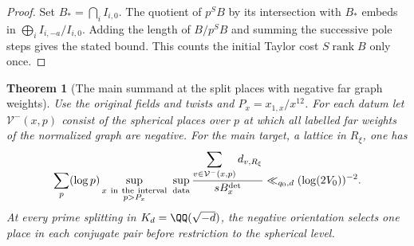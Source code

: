 \documentclass[a4paper,11pt]{article}
\newtheorem{theorem}[proposition]{Theorem}
\theoremstyle{definition}
\theoremstyle{remark}
\numberwithin{equation}{section}
\begin{document}
\begin{proof}
Set \(B_*=\bigcap_i I_{i,0}\). The quotient of \(p^SB\)
by its intersection with \(B_*\) embeds in
\(\bigoplus_i I_{i,-a}/I_{i,0}\).
Adding the length of \(B/p^SB\) and summing the successive
pole steps gives the stated bound. This counts the initial
Taylor cost \(S\operatorname{rank}B\) only once.
\end{proof}

\begin{theorem}[The main summand at the split places with negative far graph weights]
\leavevmode\label{thm:neggraph794}
Use the original fields and twists and \(P_x=x_{1,x}/x^{12}\).
For each datum let \(\mathcal V^-(x,p)\) consist of the spherical
places over \(p\) at which all labelled far weights of the
normalized graph are negative. For the main target, a lattice
in \(R_\xi\), one has
\[
 \sum_p(\log p)\sup_{\substack{x\ {\rm in\ the\ interval}\\p>P_x}}
 \ \sup_{\rm data}
 \frac{\displaystyle\sum_{v\in\mathcal V^-(x,p)}d_{v,R_\xi}}
      {s B_x^{\rm det}}
       \ll_{q_0,d} (\log(2V_0))^{-2}.
\]
At every prime splitting in \(K_d=\QQ(\sqrt{-d})\), the
negative orientation selects one place in each conjugate
pair before restriction to the spherical level.
\end{theorem}
\end{document}
